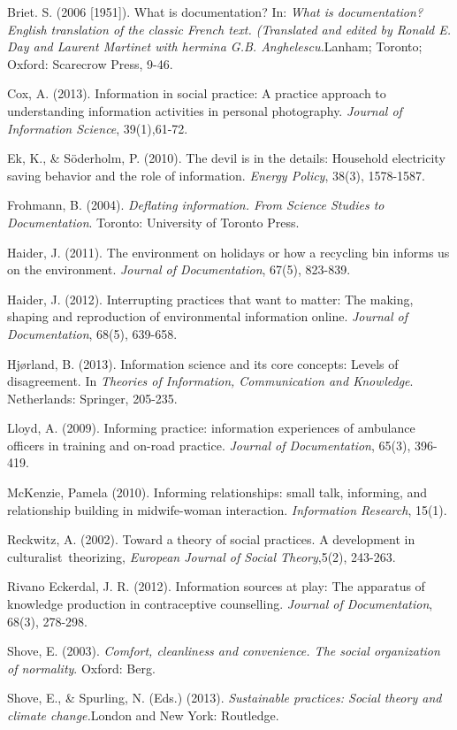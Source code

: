 \documentclass[a4paper,
fontsize=11pt,
oneside,
numbers=noperiodatend,
parskip=half-,
bibliography=totoc,
final
]{scrartcl}
\begin{document}
Briet. S. (2006 {[}1951{]}). What is documentation? In: \emph{What is
documentation? English translation of the classic French text.
(Translated and edited by Ronald E. Day and Laurent Martinet with
hermina G.B. Anghelescu.}Lanham; Toronto; Oxford: Scarecrow Press,
9-46.~

Cox, A. (2013). Information in social practice: A practice approach to
understanding information activities in personal photography.
\emph{Journal of Information Science}, 39(1),61-72.

Ek, K., \& Söderholm, P. (2010). The devil is in the details: Household
electricity saving behavior and the role of information. \emph{Energy
Policy}, 38(3), 1578-1587.

Frohmann, B. (2004). \emph{Deflating information. From Science Studies
to Documentation}. Toronto: University of Toronto Press.

Haider, J. (2011). The environment on holidays or how a recycling bin
informs us on the environment. \emph{Journal of Documentation}, 67(5),
823-839.

Haider, J. (2012). Interrupting practices that want to matter: The
making, shaping and reproduction of environmental information online.
\emph{Journal of Documentation}, 68(5), 639-658.

Hjørland, B. (2013). Information science and its core concepts: Levels
of disagreement. In \emph{Theories of Information, Communication and
Knowledge}. Netherlands: Springer, 205-235.

Lloyd, A. (2009). Informing practice: information experiences of
ambulance officers in training and on-road practice. \emph{Journal of
Documentation}, 65(3), 396-419.

McKenzie, Pamela (2010). Informing relationships: small talk, informing,
and relationship building in midwife-woman interaction.
\emph{Information Research}, 15(1).

Reckwitz, A. (2002). Toward a theory of social practices. A development
in culturalist~theorizing, \emph{European Journal of Social
Theory},5(2), 243-263.

Rivano Eckerdal, J. R. (2012). Information sources at play: The
apparatus of knowledge production in contraceptive counselling.
\emph{Journal of Documentation}, 68(3), 278-298.

Shove, E. (2003). \emph{Comfort, cleanliness and convenience. The social
organization of normality}. Oxford: Berg.

Shove, E., \& Spurling, N. (Eds.) (2013). \emph{Sustainable practices:
Social theory and climate change.}London and New York: Routledge.
\end{document}
